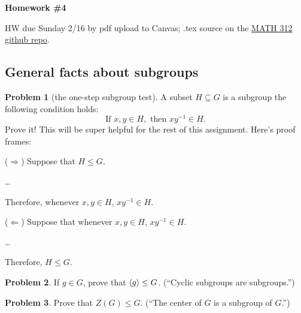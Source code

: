 \documentclass[12pt]{article}
\theoremstyle{definition} %
\newtheorem{problem}{Problem}
\newcommand\inv{^{-1}} %
\renewcommand{\section}[1]{\begin{center} \textbf{#1} \\\end{center}}
\begin{document}
\section{Homework \#4} %

HW due Sunday 2/16 by pdf upload to Canvas; .tex source on the \href{https://github.com/rhinopotamus/math312}{MATH 312 github repo}.


\subsection*{General facts about subgroups}

\begin{problem}[the one-step subgroup test]\label{onestep}
    A subset $H\subseteq G$ is a subgroup  the following condition holds:
    \begin{equation}
        \text{If } x, y \in H, \text{ then } xy^{-1}\in H.
    \end{equation}
    Prove it! This will be super helpful for the rest of this assignment. Here's proof frames:
    \begin{multicols}{2}
        ($\Rightarrow$) Suppose that $H\leq G$.

        \ldots

        Therefore, whenever $x, y \in H$, $xy\inv\in H$.

        ($\Leftarrow$) Suppose that whenever $x, y \in H$, $xy\inv\in H$.

        \ldots

        Therefore, $H \leq G$.
    \end{multicols}
\end{problem}

\begin{problem}
    If $g\in G$, prove that $\langle g\rangle \leq G$. (``Cyclic subgroups are subgroups.'')
\end{problem}

\begin{problem}
    Prove that $Z(G) \leq G$. (``The center of $G$ is a subgroup of $G$.'')
\end{problem}
\end{document}
